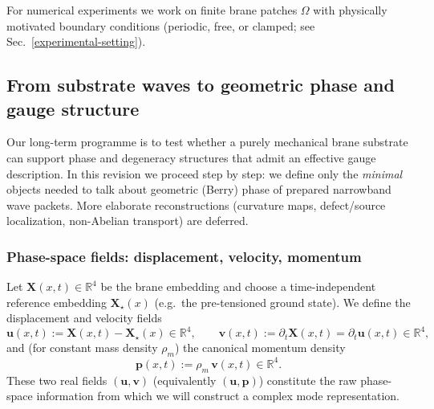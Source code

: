 For numerical experiments we work on finite brane patches
$\Omega$ with physically motivated boundary conditions
(periodic, free, or clamped; see Sec.~\ref{experimental-setting}).

\subsection{From substrate waves to geometric phase and gauge structure}
\label{sec:brane-to-berry-to-em}

Our long-term programme is to test whether a purely mechanical brane substrate can
support phase and degeneracy structures that admit an effective gauge description.
In this revision we proceed step by step: we define only the \emph{minimal} objects
needed to talk about geometric (Berry) phase of prepared narrowband wave packets.
More elaborate reconstructions (curvature maps, defect/source localization, non-Abelian
transport) are deferred.

\subsubsection{Phase-space fields: displacement, velocity, momentum}
Let $\mathbf X(x,t)\in\mathbb R^4$ be the brane embedding and choose a time-independent
reference embedding $\mathbf X_\star(x)$ (e.g.\ the pre-tensioned ground state).
We define the displacement and velocity fields
\begin{equation}
  \mathbf u(x,t) := \mathbf X(x,t)-\mathbf X_\star(x)\in\mathbb R^4,
  \qquad
  \mathbf v(x,t) := \partial_t\mathbf X(x,t)=\partial_t\mathbf u(x,t)\in\mathbb R^4,
  \label{eq:xi-and-velocity}
\end{equation}
and (for constant mass density $\rho_m$) the canonical momentum density
\begin{equation}
  \mathbf p(x,t) := \rho_m\,\mathbf v(x,t)\in\mathbb R^4.
  \label{eq:pi-from-velocity}
\end{equation}
These two real fields $(\mathbf u,\mathbf v)$ (equivalently $(\mathbf u,\mathbf p)$)
constitute the raw phase-space information from which we will construct a complex mode
representation.

